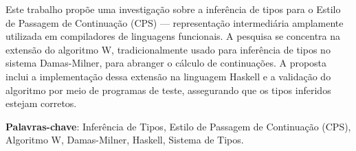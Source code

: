 
\setlength{\absparsep}{18pt}    %
\begin{resumo}
  Este trabalho propõe uma investigação sobre a inferência de tipos para o Estilo de
  Passagem de Continuação (CPS) --- representação intermediária amplamente utilizada
  em compiladores de linguagens funcionais. A pesquisa se concentra na extensão do
  algoritmo W, tradicionalmente usado para inferência de tipos no sistema Damas-Milner,
  para abranger o cálculo de continuações. A proposta inclui a implementação dessa
  extensão na linguagem Haskell e a validação do algoritmo por meio de programas de
  teste, assegurando que os tipos inferidos estejam corretos.

  \textbf{Palavras-chave}: Inferência de Tipos, Estilo de Passagem de Continuação
  (CPS), Algoritmo W, Damas-Milner, Haskell, Sistema de Tipos.
\end{resumo}
